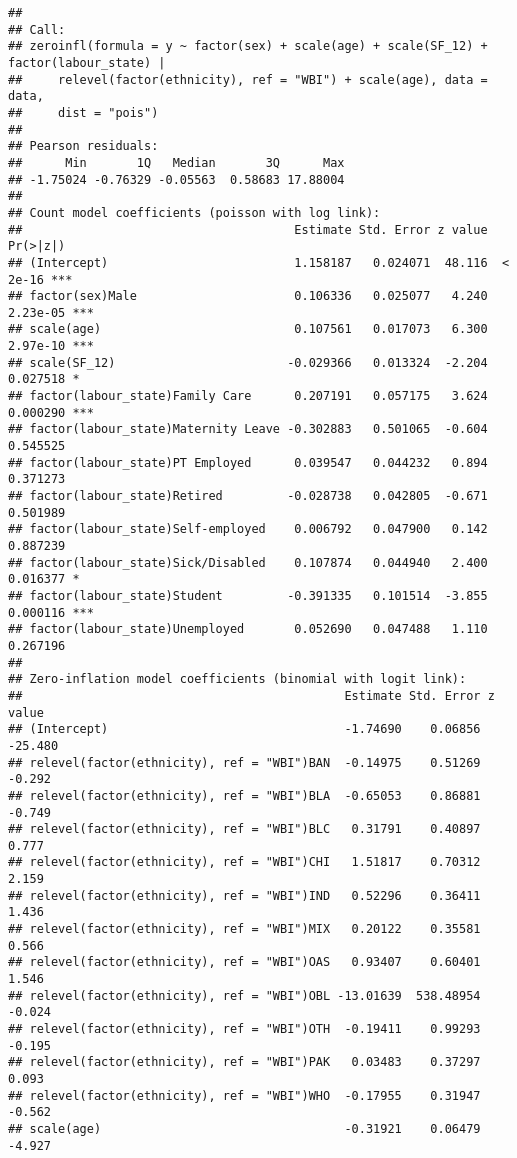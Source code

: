 \documentclass[
]{article}
\begin{document}
\begin{verbatim}
## 
## Call:
## zeroinfl(formula = y ~ factor(sex) + scale(age) + scale(SF_12) + factor(labour_state) | 
##     relevel(factor(ethnicity), ref = "WBI") + scale(age), data = data, 
##     dist = "pois")
## 
## Pearson residuals:
##      Min       1Q   Median       3Q      Max 
## -1.75024 -0.76329 -0.05563  0.58683 17.88004 
## 
## Count model coefficients (poisson with log link):
##                                      Estimate Std. Error z value Pr(>|z|)    
## (Intercept)                          1.158187   0.024071  48.116  < 2e-16 ***
## factor(sex)Male                      0.106336   0.025077   4.240 2.23e-05 ***
## scale(age)                           0.107561   0.017073   6.300 2.97e-10 ***
## scale(SF_12)                        -0.029366   0.013324  -2.204 0.027518 *  
## factor(labour_state)Family Care      0.207191   0.057175   3.624 0.000290 ***
## factor(labour_state)Maternity Leave -0.302883   0.501065  -0.604 0.545525    
## factor(labour_state)PT Employed      0.039547   0.044232   0.894 0.371273    
## factor(labour_state)Retired         -0.028738   0.042805  -0.671 0.501989    
## factor(labour_state)Self-employed    0.006792   0.047900   0.142 0.887239    
## factor(labour_state)Sick/Disabled    0.107874   0.044940   2.400 0.016377 *  
## factor(labour_state)Student         -0.391335   0.101514  -3.855 0.000116 ***
## factor(labour_state)Unemployed       0.052690   0.047488   1.110 0.267196    
## 
## Zero-inflation model coefficients (binomial with logit link):
##                                             Estimate Std. Error z value
## (Intercept)                                 -1.74690    0.06856 -25.480
## relevel(factor(ethnicity), ref = "WBI")BAN  -0.14975    0.51269  -0.292
## relevel(factor(ethnicity), ref = "WBI")BLA  -0.65053    0.86881  -0.749
## relevel(factor(ethnicity), ref = "WBI")BLC   0.31791    0.40897   0.777
## relevel(factor(ethnicity), ref = "WBI")CHI   1.51817    0.70312   2.159
## relevel(factor(ethnicity), ref = "WBI")IND   0.52296    0.36411   1.436
## relevel(factor(ethnicity), ref = "WBI")MIX   0.20122    0.35581   0.566
## relevel(factor(ethnicity), ref = "WBI")OAS   0.93407    0.60401   1.546
## relevel(factor(ethnicity), ref = "WBI")OBL -13.01639  538.48954  -0.024
## relevel(factor(ethnicity), ref = "WBI")OTH  -0.19411    0.99293  -0.195
## relevel(factor(ethnicity), ref = "WBI")PAK   0.03483    0.37297   0.093
## relevel(factor(ethnicity), ref = "WBI")WHO  -0.17955    0.31947  -0.562
## scale(age)                                  -0.31921    0.06479  -4.927

\end{verbatim}
\end{document}

